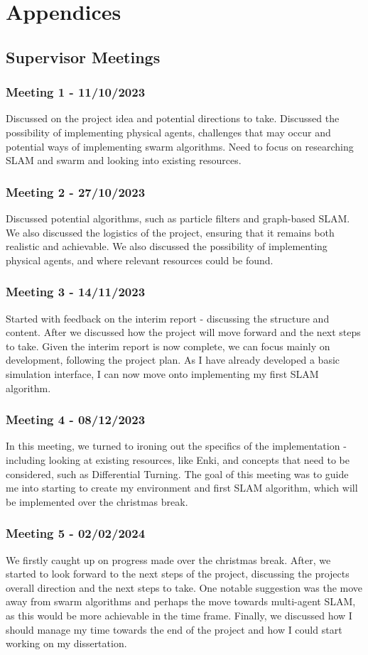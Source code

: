 \documentclass[12pt]{article}
\begin{document}
\section{Appendices}

\subsection{Supervisor Meetings}    %

\subsubsection{Meeting 1 - 11/10/2023}
Discussed on the project idea and potential directions to take. Discussed the possibility of implementing physical agents,
challenges that may occur and potential ways of implementing swarm algorithms. Need to focus on researching SLAM and swarm
and looking into existing resources.
\subsubsection{Meeting 2 - 27/10/2023}
Discussed potential algorithms, such as particle filters and graph-based SLAM. We also discussed the logistics of the project,
ensuring that it remains both realistic and achievable. We also discussed the possibility of implementing physical agents,
and where relevant resources could be found.
\subsubsection{Meeting 3 - 14/11/2023}
Started with feedback on the interim report - discussing the structure and content. After we discussed how the project will
move forward and the next steps to take. Given the interim report is now complete, we can focus mainly on development, following
the project plan. As I have already developed a basic simulation interface, I can now move onto implementing my first SLAM algorithm.
\subsubsection{Meeting 4 - 08/12/2023}
In this meeting, we turned to ironing out the specifics of the implementation - including looking at existing resources, like
Enki, and concepts that need to be considered, such as Differential Turning. The goal of this meeting was to guide me into
starting to create my environment and first SLAM algorithm, which will be implemented over the christmas break.
\subsubsection{Meeting 5 - 02/02/2024}
We firstly caught up on progress made over the christmas break. After, we started to look forward to the next steps of the project,
discussing the projects overall direction and the next steps to take. One notable suggestion was the move away from swarm algorithms
and perhaps the move towards multi-agent SLAM, as this would be more achievable in the time frame. Finally, we discussed how I
should manage my time towards the end of the project and how I could start working on my dissertation.
\end{document}

